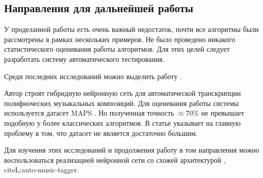 \subsection{Направления для дальнейшей работы}

У проделанной работы есть очень важный недостаток, почти
все алгоритмы были рассмотрены в рамках нескольких примеров.
Не было проведено никакого статистического оценивания работы
алгоритмов. Для этих целей следует разработать систему автоматического
тестирования.

Среди последних исследований можно выделить работу \cite{SBETENN}.

Автор строят гибридную нейронную сеть для автоматической транскрипции
полифноческих музыкальных композиций. Для оценевания работы системы
используется датасет MAPS \cite{L:MAPS}. Но полученная точность $\approx 70\%$
не превышает подобную у более классических алгоритмов.
В статье указывает на главную проблему в том, что датасет не является
достаточно большим.

Для изучения этих исследований и продолжения работу в том направления
можно воспользоваться реализацией нейронной сети со схожей архитектурой
\cite{KCFGAMT}, cite{L:auto-music-tagger}.
